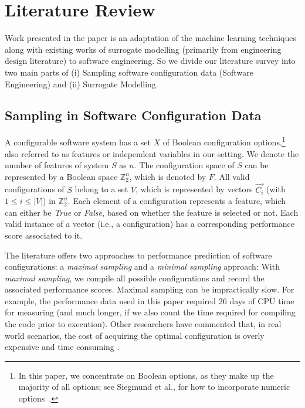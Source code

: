 \documentclass{newsig}
\begin{document}
\section{Literature Review}
Work presented in the paper is an adaptation of the machine learning techniques along with existing works of surrogate modelling (primarily from engineering design literature) to software engineering. So we divide our literature survey into two main parts of (i) Sampling software configuration data (Software Engineering) and (ii) Surrogate Modelling. 

\subsection{Sampling in Software Configuration Data}
A configurable software system has a set $X$ of Boolean configuration options,\footnote{In this paper, we concentrate on Boolean options, as they make up the majority of all options; see Siegmund et al., for how to incorporate numeric options~\cite{SGA+15}.} also referred to as features or independent variables in our setting.
We denote the number of features of system $S$ as $n$. The configuration space of $S$ can be represented by a Boolean space $\mathbb{Z}_{2}^{n}$, which is denoted by $F$. All valid configurations of $S$ belong to a set $V$, which is represented by vectors $\vec{C_i}$ (with $1\leq i\leq \left\vert{V}\right\vert$) in $\mathbb{Z}_{2}^{n}$. Each element of a configuration represents a feature, which can either be \emph{True} or \emph{False}, based on whether the feature is selected or not. 
Each valid instance of a vector (i.e., a configuration) has a corresponding performance score associated to it. 

The literature offers two approaches to performance prediction of software configurations: a {\em maximal sampling} and a {\em minimal sampling} approach: 
With {\em maximal sampling}, we compile all  possible configurations and record the associated performance scores. 
Maximal sampling  can be impractically slow. For example, the performance data used in this paper required  26 days of CPU time for measuring (and much longer, if we also count the time required for compiling the code prior to execution). 
 Other researchers have commented that,  in 
 real world scenarios, the cost of acquiring the optimal configuration is overly expensive and time consuming \cite{weiss2008maximizing}.
 
\end{document}
